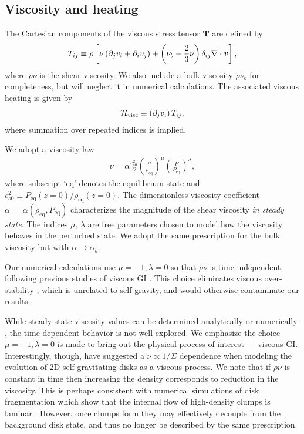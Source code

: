 \subsection{Viscosity and heating}\label{visc_model}
The Cartesian components of the viscous stress tensor $\bm{T}$ are
defined by 
\begin{align}
  T_{ij} \equiv \rho \left[\nu \left(\partial_j v_i + \partial_i v_j\right) +
    \left(\nu_b-\frac{2}{3}\nu\right)\delta_{ij}\nabla\cdot\bm{v}\right], 
\end{align}
where $\rho\nu$ is the shear viscosity. We also include a bulk
viscosity $\rho\nu_b$ for completeness, but will neglect it in
numerical calculations. The associated viscous heating is given by 
\begin{align}
  \mathcal{H}_\mathrm{visc} \equiv \left(\partial_jv_i\right)T_{ij}, 
\end{align}
where summation over repeated indices is implied. 

We adopt a viscosity law  
\begin{align}\label{visc_law}
  \nu = \alpha
  \frac{c_{s0}^2}{\Omega}\left(\frac{\rho}{\rho_\mathrm{eq}}\right)^\mu\left(\frac{P}{P_\mathrm{eq}}\right)^\lambda,             
\end{align}
where subscript `eq' denotes the equilibrium state and  
$c_{s0}^2\equiv P_\mathrm{eq}(z=0)/\rho_\mathrm{eq}(z=0)$. 
The dimensionless viscosity coefficient 
$\alpha=~\alpha(\rho_\mathrm{eq},P_\mathrm{eq})$ characterizes the
magnitude of the shear viscosity \emph{in steady state}. The indices
$\mu,\,\lambda$ are free parameters chosen to model how the viscosity
behaves in the perturbed state.  
We adopt the same prescription for the bulk viscosity but
with $\alpha\to\alpha_b$.   

Our numerical calculations use $\mu=-1,\lambda=0$ so 
that $\rho\nu$ is time-independent, following previous 
studies of viscous GI  
\citep{lynden-bell74,hunter83,willerding92,gammie96}.  
This choice eliminates viscous over-stability
\citep{schmit95,latter06}, which is unrelated to self-gravity, and
would otherwise contaminate our results. %

While steady-state viscosity values can be determined 
analytically or numerically \citep[e.g.][]{martin11,kratter08,rafikov15}, the time-dependent behavior is
not well-explored. We emphasize the choice $\mu=-1,\lambda=0$ is made
to bring out the physical process of interest --- viscous GI. 
Interestingly, though, \cite{laughlin96b} have suggested a $\nu \propto 1/\Sigma$
dependence when modeling the evolution of 2D self-gravitating disks 
as a viscous process. We note that if $\rho\nu$ is constant in time
then increasing the density corresponds to reduction in the viscosity. 
This is perhaps consistent with numerical simulations of disk
fragmentation which show that the internal flow of high-density clumps
is laminar \citep{gammie01}. However, once clumps form they may
effectively decouple from the background disk state, and thus no 
longer be described by the same prescription. 

